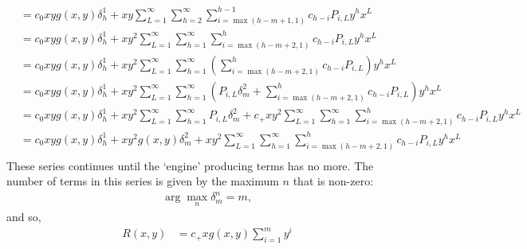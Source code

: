 	\begin{align}
		&= c_0 xy g(x, y)\delta_h^1 + xy \sum_{L=1}^\infty\sum_{h=2}^\infty\sum_{i=\max(h-m+1, 1)}^{h-1} c_{h-i}P_{i, L}y^hx^L\\
		&= c_0xy g(x, y)\delta_h^1 + xy^2 \sum_{L=1}^\infty\sum_{h=1}^\infty\sum_{i=\max(h-m+2, 1)}^{h} c_{h-i}P_{i, L}y^hx^L\\
		&= c_0xy g(x, y)\delta_h^1 + xy^2 \sum_{L=1}^\infty\sum_{h=1}^\infty\left(\sum_{i=\max(h-m+2, 1)}^{h} c_{h-i}P_{i, L}\right)y^hx^L\\
		&= c_0xy g(x, y)\delta_h^1 + xy^2 \sum_{L=1}^\infty\sum_{h=1}^\infty\left(P_{i, L}\delta_m^2 + \sum_{i=\max(h-m+2, 1)}^{h} c_{h-i}P_{i, L}\right)y^hx^L\\
		&= c_0xy g(x, y)\delta_h^1 + xy^2 \sum_{L=1}^\infty\sum_{h=1}^\infty P_{i, L}\delta_m^2 + c_+xy^2 \sum_{L=1}^\infty\sum_{h=1}^\infty\sum_{i=\max(h-m+2, 1)}^{h} c_{h-i}P_{i, L}y^hx^L\\
		&= c_0xy g(x, y)\delta_h^1 + xy^2 g(x, y)\delta_m^2 + xy^2 \sum_{L=1}^\infty\sum_{h=1}^\infty\sum_{i=\max(h-m+2, 1)}^{h} c_{h-i} P_{i, L}y^hx^L\\
	\end{align}
	These series continues until the `engine' producing terms has no more. The number of terms in this series is given by the maximum $n$ that is non-zero:
	\begin{align}
		\arg \max_n \delta_m^n = m,
	\end{align}
	and so,
	\begin{align}
		R(x, y) &= c_+ x g(x, y)\sum_{i=1}^m y^i
	\end{align}
